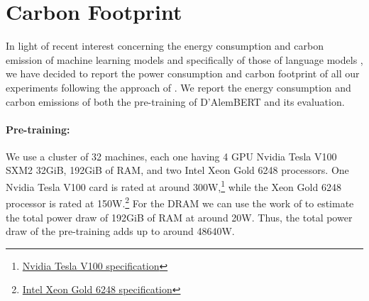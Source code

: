 \section{Carbon Footprint}\label{carbon-footprint-dalembert}

\begin{table}[th]
    \centering\small
    \caption{Average power draw, number of models trained, training times in hours, mean power consumption including power usage effectiveness (PUE), and CO\textsuperscript{2} emissions; for each setting.}
    \label{tab:carbon-dalembert}
\end{table}

In light of recent interest concerning the energy consumption and carbon emission of machine learning models and specifically of those of language models \cite{schwartz-etal-2020-green,bender-etal-2021-on}, we have decided to report the power consumption and carbon footprint of all our experiments following the approach of . We report the energy consumption and carbon emissions of both the pre-training of D'AlemBERT and its evaluation.

\paragraph{Pre-training:} We use a cluster of 32 machines, each one having 4 GPU Nvidia Tesla V100 SXM2 32GiB, 192GiB of RAM, and two Intel Xeon Gold 6248 processors. One Nvidia Tesla V100 card is rated at around 300W,\footnote{\href{https://www.nvidia.com/en-us/data-center/v100/}{ Nvidia Tesla V100 specification}} while the Xeon Gold 6248 processor is rated at 150W.\footnote{\href{https://ark.intel.com/content/www/us/en/ark/products/192446/intel-xeon-gold-6248-processor-27-5m-cache-2-50-ghz.html}{Intel Xeon Gold 6248 specification}} For the DRAM we can use the work of  to estimate the total power draw of 192GiB of RAM at around 20W. Thus, the total power draw of the pre-training adds up to around 48640W.

